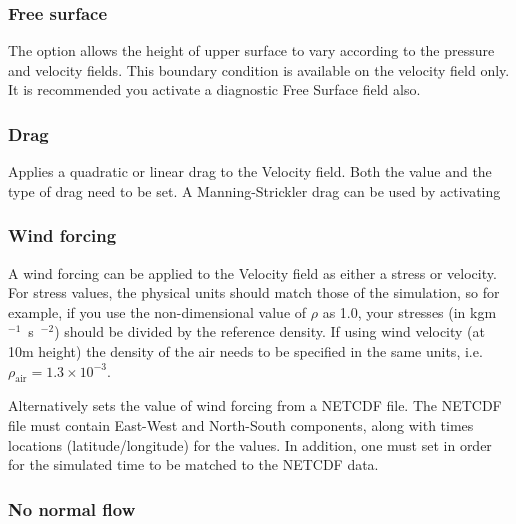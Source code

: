 \subsubsection{Free surface}

The  option allows the height of upper surface to vary according
to the pressure and velocity fields. This boundary condition is available on the velocity field only. It is
recommended you activate a diagnostic Free Surface field also.

\subsubsection{Drag}

Applies a quadratic or linear drag to the Velocity field. Both the value and the type of drag need to be set. A Manning-Strickler drag can be used by activating 

\subsubsection{Wind forcing}\label{Sect:wind_forcing}

A wind forcing can be applied to the Velocity field as either a stress or
velocity. For stress values, the physical units should match those of the
simulation, so for example, if you use the non-dimensional value of $\rho$
as 1.0, your stresses (in \unit{kgm\ensuremath{^{-1}}s\ensuremath{^{-2}}})
should be divided by the reference density.  If using wind velocity
(at 10m height) the density of the air needs to be specified in the same
units, i.e. $\rho_{\textrm{air}} = 1.3\times10^{-3}$.

Alternatively
sets the value of wind forcing from a NETCDF file. The NETCDF file must
contain East-West and North-South components, along with times locations
(latitude/longitude) for the values. In addition, one must set
 in order for the simulated
time to be matched to the NETCDF data.

\subsubsection{No normal flow}

